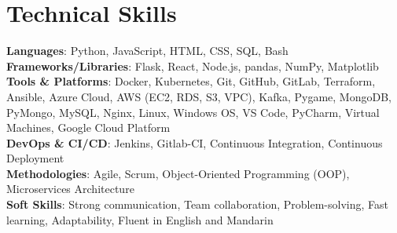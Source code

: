 \documentclass[letterpaper,11pt]{article}
\begin{document}
\section{Technical Skills}
 \begin{itemize}[leftmargin=0.15in, label={}]
    \small{\item{
     \textbf{Languages}{: Python, JavaScript, HTML, CSS, SQL, Bash} \\
     \textbf{Frameworks/Libraries}{: Flask, React, Node.js, pandas, NumPy, Matplotlib} \\
     \textbf{Tools \& Platforms}{: Docker, Kubernetes, Git, GitHub, GitLab, Terraform, Ansible, Azure Cloud, AWS (EC2, RDS, S3, VPC), Kafka, Pygame, MongoDB, PyMongo, MySQL, Nginx, Linux, Windows OS, VS Code, PyCharm, Virtual Machines, Google Cloud Platform} \\
     \textbf{DevOps \& CI/CD}{: Jenkins, Gitlab-CI, Continuous Integration, Continuous Deployment} \\
     \textbf{Methodologies}{: Agile, Scrum, Object-Oriented Programming (OOP), Microservices Architecture} \\
     \textbf{Soft Skills}{: Strong communication, Team collaboration, Problem-solving, Fast learning, Adaptability, Fluent in English and Mandarin}
    }}
 \end{itemize}


\end{document}
